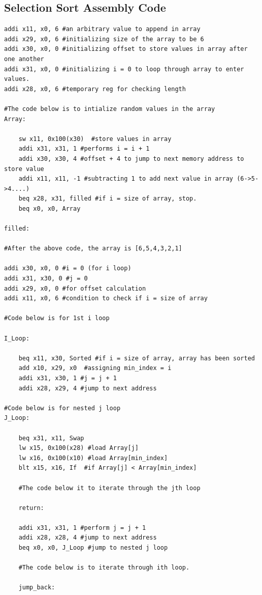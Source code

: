 \documentclass{article}
\begin{document}
\subsection{Selection Sort Assembly Code} 
\begin{lstlisting}[caption={Selection Sort Assembly code}, captionpos=b, language=RISC-V]
addi x11, x0, 6 #an arbitrary value to append in array
addi x29, x0, 6 #initializing size of the array to be 6
addi x30, x0, 0 #initializing offset to store values in array after one another
addi x31, x0, 0 #initializing i = 0 to loop through array to enter values.
addi x28, x0, 6 #temporary reg for checking length

#The code below is to intialize random values in the array
Array:

    sw x11, 0x100(x30)  #store values in array
    addi x31, x31, 1 #performs i = i + 1
    addi x30, x30, 4 #offset + 4 to jump to next memory address to store value
    addi x11, x11, -1 #subtracting 1 to add next value in array (6->5->4....)
    beq x28, x31, filled #if i = size of array, stop.
    beq x0, x0, Array
    
filled:

#After the above code, the array is [6,5,4,3,2,1]

addi x30, x0, 0 #i = 0 (for i loop)
addi x31, x30, 0 #j = 0
addi x29, x0, 0 #for offset calculation
addi x11, x0, 6 #condition to check if i = size of array 

#Code below is for 1st i loop

I_Loop:

    beq x11, x30, Sorted #if i = size of array, array has been sorted
    add x10, x29, x0  #assigning min_index = i
    addi x31, x30, 1 #j = j + 1
    addi x28, x29, 4 #jump to next address

#Code below is for nested j loop
J_Loop:

    beq x31, x11, Swap
    lw x15, 0x100(x28) #load Array[j]
    lw x16, 0x100(x10) #load Array[min_index]
    blt x15, x16, If  #if Array[j] < Array[min_index]
    
    #The code below it to iterate through the jth loop
    
    return: 
    
    addi x31, x31, 1 #perform j = j + 1
    addi x28, x28, 4 #jump to next address
    beq x0, x0, J_Loop #jump to nested j loop
    
    #The code below is to iterate through ith loop.
    
    jump_back:
    

\end{lstlisting}
\end{document}
